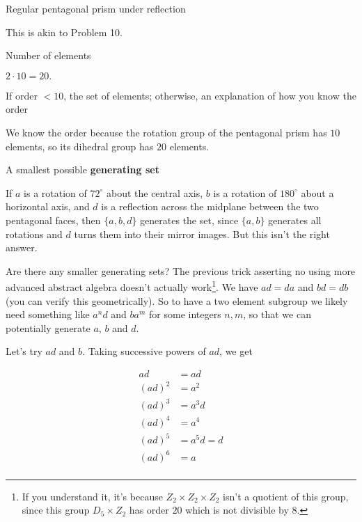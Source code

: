 \documentclass[../gatm_answers.tex]{subfiles}
\begin{document}
\begin{outer_problem}
\item Regular pentagonal prism under reflection
\end{outer_problem}

This is akin to Problem 10.

\begin{inner_problem}[start=1]
\item Number of elements
\end{inner_problem}

$2\cdot 10=20.$

\begin{inner_problem}
\item If order $< 10$, the set of elements; otherwise, an explanation of how you know the order
\end{inner_problem}

We know the order because the rotation group of the pentagonal prism has $10$ elements, so its dihedral group has $20$ elements.

\begin{inner_problem}
\item A smallest possible \textbf{generating set}
\end{inner_problem}

If $a$ is a rotation of $72^\circ$ about the central axis, $b$ is a rotation of $180^\circ$ about a horizontal axis, and $d$ is a reflection across the midplane between the two pentagonal faces, then $\{a,b,d\}$ generates the set, since $\{a,b\}$ generates all rotations and $d$ turns them into their mirror images. But this isn't the right answer.

Are there any smaller generating sets? The previous trick asserting no using more advanced abstract algebra doesn't actually work\footnote{If you understand it, it's because $Z_2\times Z_2\times Z_2$ isn't a quotient of this group, since this group $D_5 \times Z_2$ has order $20$ which is not divisible by $8$.}. We have $ad=da$ and $bd=db$ (you can verify this geometrically). So to have a two element subgroup we likely need something like $a^nd$ and $ba^m$ for some integers $n,m$, so that we can potentially generate $a$, $b$ and $d$.

Let's try $ad$ and $b$. Taking successive powers of $ad$, we get

\begin{align*}
ad &= ad \\
(ad)^2 &= a^2 \\
(ad)^3 &= a^3d \\
(ad)^4 &= a^4 \\
(ad)^5 &= a^5d = d \\
(ad)^6 &= a \\
\end{align*}
\end{document}
